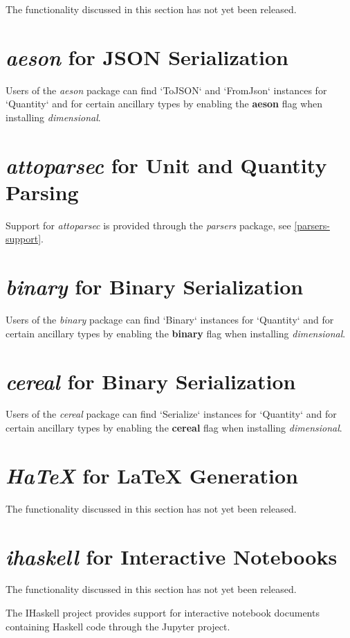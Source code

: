 \documentclass[11pt]{report}
\newcommand{\packagename}[1]{\textit{#1}}
\newcommand{\thispackage}{\packagename{dimensional}}
\newcommand{\flag}[1]{\textbf{#1}}
\newcommand{\prerelease}{\begin{framed}
The functionality discussed in this section has not yet been released.
\end{framed}}
\begin{document}
\prerelease{}

\section{\packagename{aeson} for JSON Serialization}

Users of the \packagename{aeson} package can find `ToJSON`
and `FromJson` instances for `Quantity` and for certain ancillary types by
enabling the \flag{aeson} flag when installing \thispackage{}.

\section{\packagename{attoparsec} for Unit and Quantity Parsing}

Support for \packagename{attoparsec} is provided through the \packagename{parsers} package, see \ref{parsers-support}.

\section{\packagename{binary} for Binary Serialization}

Users of the \packagename{binary} package can find `Binary`
instances for `Quantity` and for certain ancillary types by
enabling the \flag{binary} flag when installing \thispackage{}.

\section{\packagename{cereal} for Binary Serialization}

Users of the \packagename{cereal} package can find `Serialize`
instances for `Quantity` and for certain ancillary types by
enabling the \flag{cereal} flag when installing \thispackage{}.

\section{\packagename{HaTeX} for \LaTeX{} Generation}

\prerelease{}

\section{\packagename{ihaskell} for Interactive Notebooks}

\prerelease{}

The IHaskell project provides support for interactive notebook documents containing
Haskell code through the Jupyter project.
\end{document}
